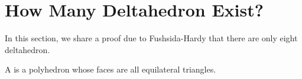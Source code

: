 \section{How Many Deltahedron Exist?}
\label{sec:deltahedron}

In this section, we share a proof due to
Fushsida-Hardy \cite{deltahedron} that there are
only eight deltahedron.

A  is a polyhedron whose
faces are all equilateral triangles.



